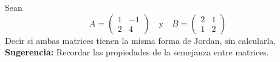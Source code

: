 \item Sean \[A=\begin{pmatrix}
        1&-1\\2&4
    \end{pmatrix}\quad\text{y}\quad B=\begin{pmatrix}
        2&1\\1&2
    \end{pmatrix}\]
    Decir si ambas matrices tienen la misma forma de Jordan, sin calcularla.
    \textbf{Sugerencia:} Recordar las propiedades de la semejanza entre matrices.
    \begin{mdframed}[style=s]
        
    \end{mdframed}